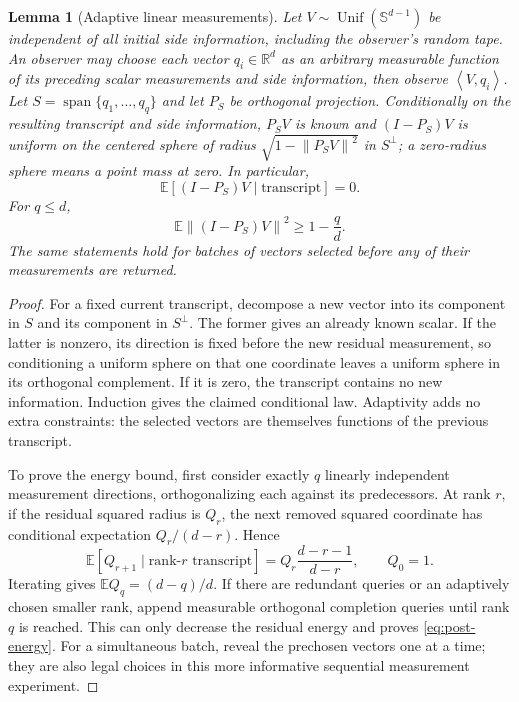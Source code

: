 \documentclass[11pt,a4paper]{article}
\numberwithin{equation}{section}
\newtheorem{lemma}[theorem]{Lemma}
\theoremstyle{remark}
\newcommand{\R}{\mathbb R}
\newcommand{\E}{\mathbb E}
\newcommand{\norm}[1]{\left\lVert #1\right\rVert}
\newcommand{\ip}[2]{\left\langle #1,#2\right\rangle}
\newcommand{\Sph}{\mathbb S^{d-1}}
\DeclareMathOperator{\spanop}{span}
\DeclareMathOperator{\Unif}{Unif}
\begin{document}
\begin{lemma}[Adaptive linear measurements]\label{lem:posterior}
Let $V\sim\Unif(\Sph)$ be independent of all initial side information, including the observer's random tape.
An observer may choose each vector $q_i\in\R^d$ as an arbitrary measurable
function of its preceding scalar measurements and side information,
then observe $\ip V{q_i}$. Let
$S=\spanop\{q_1,\ldots,q_q\}$ and let $P_S$ be orthogonal projection.
Conditionally on the resulting transcript and side information, $P_SV$ is known and
$(I-P_S)V$ is uniform on the centered sphere of radius
$\sqrt{1-\norm{P_SV}^2}$ in $S^\perp$; a zero-radius sphere means a point mass at zero. In particular,
\begin{equation}
 \E[(I-P_S)V\mid\text{transcript}]=0.     \label{eq:post-center}
\end{equation}
For $q\le d$,
\begin{equation}
 \E\norm{(I-P_S)V}^2\ge1-\frac qd.       \label{eq:post-energy}
\end{equation}
The same statements hold for batches of vectors selected before any
of their measurements are returned.
\end{lemma}
\begin{proof}
For a fixed current transcript, decompose a new vector into its component
in $S$ and its component in $S^\perp$. The former gives an already known
scalar. If the latter is nonzero, its direction is fixed before the
new residual measurement, so conditioning a uniform sphere on that
one coordinate leaves a uniform sphere in its orthogonal complement.
If it is zero, the transcript contains no new information. Induction
gives the claimed conditional law. Adaptivity adds no extra constraints:
the selected vectors are themselves functions of the previous transcript.

To prove the energy bound, first consider exactly $q$ linearly
independent measurement directions, orthogonalizing each against its
predecessors. At rank $r$, if the residual squared radius is $Q_r$, the
next removed squared coordinate has conditional expectation
$Q_r/(d-r)$. Hence
\[
 \E[Q_{r+1}\mid\text{rank-}r\text{ transcript}]
 =Q_r\frac{d-r-1}{d-r},\qquad Q_0=1.
\]
Iterating gives $\E Q_q=(d-q)/d$.
If there are redundant queries or an adaptively chosen smaller rank,
append measurable orthogonal completion queries until rank $q$ is
reached. This can only decrease the residual energy and proves
\eqref{eq:post-energy}. For a simultaneous batch, reveal the prechosen
vectors one at a time; they are also legal choices in this more
informative sequential measurement experiment.
\end{proof}
\end{document}
